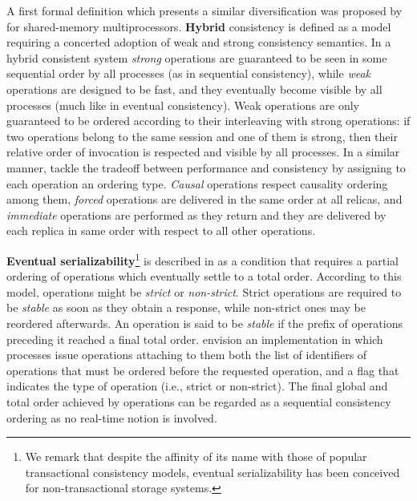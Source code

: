 \documentclass[letter, 11pt]{article}
\newcommand{\citeN}{\citet}
\renewcommand{\cite}{\citep}
\begin{document}
A first formal definition which presents a similar diversification was proposed by 
\citeN{Attiya.Friedman:92} for shared-memory multiprocessors.
\textbf{Hybrid} consistency is defined as a model requiring a concerted adoption 
of weak and strong consistency semantics.
In a hybrid consistent system \emph{strong} operations are guaranteed to be seen 
in some sequential order by all processes (as in sequential consistency), 
while \emph{weak} operations are designed to be fast, and they eventually become visible by all processes
(much like in eventual consistency).
Weak operations are only guaranteed to be ordered according to their interleaving with strong operations:
if two operations belong to the same session and one of them is strong, 
then their relative order of invocation is respected and visible by all processes. 
In a similar manner, \citeN{Ladin.ea:92} tackle the tradeoff between performance and consistency 
by assigning to each operation an ordering type.
\emph{Causal} operations respect causality ordering among them,
\emph{forced} operations are delivered in the same order at all relicas, 
and \emph{immediate} operations are performed as they return and they are delivered by each replica in same order with respect to all other operations.

\textbf{Eventual serializability}\footnote{We remark that despite the affinity of its name with
those of popular transactional consistency models, eventual serializability 
has been conceived for non-transactional storage systems.}
is described in \cite{Fekete.Gupta.ea:96} as a condition that requires a partial ordering
of operations which eventually settle to a total order.
According to this model, operations might be \emph{strict} or \emph{non-strict}.
Strict operations are required to be \emph{stable} as soon as they obtain a response, while non-strict ones
may be reordered afterwards.
An operation is said to be \emph{stable} if the prefix of operations preceding it reached a final total order.
\citeN{Fekete.Gupta.ea:96} envision an implementation in which processes issue operations attaching to them both the list of 
identifiers of operations that must be ordered before the requested operation, and a flag that indicates the type of operation
(i.e., strict or non-strict).
The final global and total order achieved by operations can be regarded as a 
sequential consistency ordering as no real-time notion is involved. 
\end{document}
